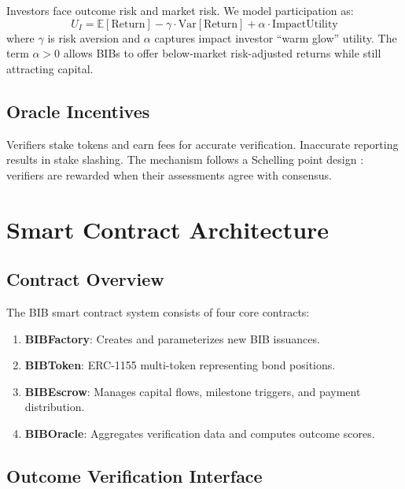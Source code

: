 \documentclass[11pt,a4paper]{article}
\newcommand{\E}{\mathbb{E}}
\begin{document}
Investors face outcome risk and market risk. We model participation as:
\begin{equation}
  U_I = \E[\text{Return}] - \gamma \cdot \text{Var}[\text{Return}]
  + \alpha \cdot \text{ImpactUtility}
\end{equation}
where $\gamma$ is risk aversion and $\alpha$ captures impact investor
``warm glow'' utility. The term $\alpha > 0$ allows BIBs to offer
below-market risk-adjusted returns while still attracting capital.

\subsection{Oracle Incentives}

Verifiers stake tokens and earn fees for accurate verification.
Inaccurate reporting results in stake slashing. The mechanism follows a
Schelling point design \citep{buterin2014schellingcoin}: verifiers are
rewarded when their assessments agree with consensus.


\section{Smart Contract Architecture}
\label{sec:contracts}

\subsection{Contract Overview}

The BIB smart contract system consists of four core contracts:

\begin{enumerate}
  \item \textbf{BIBFactory}: Creates and parameterizes new BIB issuances.
  \item \textbf{BIBToken}: ERC-1155 multi-token representing bond
    positions.
  \item \textbf{BIBEscrow}: Manages capital flows, milestone triggers,
    and payment distribution.
  \item \textbf{BIBOracle}: Aggregates verification data and computes
    outcome scores.
\end{enumerate}

\subsection{Outcome Verification Interface}
\end{document}
